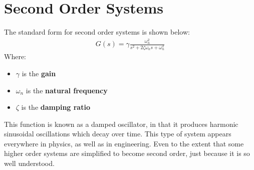 \documentclass[class=report, crop=false, 12pt,a4paper]{standalone}
\begin{document}
\section{Second Order Systems}
The standard form for second order systems is shown below:
\begin{gather}
  G(s) = \gamma \frac{\omega_n^2}{s^2 + 2\zeta \omega_n s + \omega_n^2}
\end{gather}
Where:
\begin{itemize}
  \item $\gamma$ is the \textbf{gain}
  \item $\omega_n$ is the \textbf{natural frequency}
  \item $\zeta$ is the \textbf{damping ratio}
\end{itemize}
This function is known as a damped oscillator, in that it produces harmonic sinusoidal oscillations which decay over time. This type of system appears everywhere in physics, as well as in engineering. Even to the extent that some higher order systems are simplified to become second order, just because it is so well understood.
\end{document}
